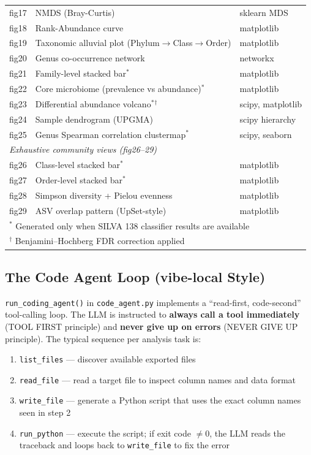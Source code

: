 \documentclass[12pt, a4paper]{article}
\begin{document}
\begin{table}[h]
\begin{tabular}{clp{5.5cm}}
    fig17 & NMDS (Bray-Curtis) & sklearn MDS \\
    fig18 & Rank-Abundance curve & matplotlib \\
    fig19 & Taxonomic alluvial plot (Phylum$\to$Class$\to$Order) & matplotlib \\
    fig20 & Genus co-occurrence network & networkx \\
    fig21 & Family-level stacked bar$^*$ & matplotlib \\
    fig22 & Core microbiome (prevalence vs abundance)$^*$ & matplotlib \\
    fig23 & Differential abundance volcano$^*$$^{\dagger}$ & scipy, matplotlib \\
    fig24 & Sample dendrogram (UPGMA) & scipy hierarchy \\
    fig25 & Genus Spearman correlation clustermap$^*$ & scipy, seaborn \\
    \midrule
    \multicolumn{3}{l}{\textit{Exhaustive community views (fig26--29)}} \\
    fig26 & Class-level stacked bar$^*$ & matplotlib \\
    fig27 & Order-level stacked bar$^*$ & matplotlib \\
    fig28 & Simpson diversity + Pielou evenness & matplotlib \\
    fig29 & ASV overlap pattern (UpSet-style) & matplotlib \\
    \bottomrule
    \multicolumn{3}{l}{\small $^*$ Generated only when SILVA 138 classifier results are available} \\
    \multicolumn{3}{l}{\small $^{\dagger}$ Benjamini--Hochberg FDR correction applied}
  \end{tabular}
\end{table}

\subsection{The Code Agent Loop (vibe-local Style)}

\texttt{run\_coding\_agent()} in \texttt{code\_agent.py} implements
a ``read-first, code-second'' tool-calling loop.
The LLM is instructed to \textbf{always call a tool immediately}
(TOOL FIRST principle) and \textbf{never give up on errors}
(NEVER GIVE UP principle).
The typical sequence per analysis task is:

\begin{enumerate}[leftmargin=2em]
  \item \texttt{list\_files} --- discover available exported files
  \item \texttt{read\_file} --- read a target file to inspect
    column names and data format
  \item \texttt{write\_file} --- generate a Python script that uses
    the exact column names seen in step 2
  \item \texttt{run\_python} --- execute the script;
    if exit code $\neq 0$, the LLM reads the traceback and loops
    back to \texttt{write\_file} to fix the error
\end{enumerate}
\end{document}
